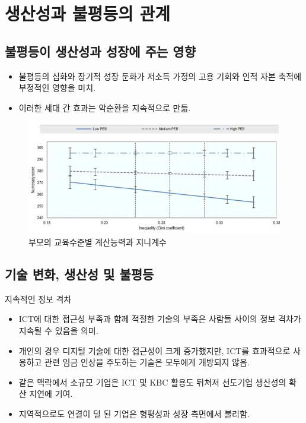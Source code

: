 \documentclass[aspectratio=169,xcolor=dvipsnames,handout]{beamer}
\begin{document}
\section{생산성과 불평등의 관계}

\subsection{ 불평등이 생산성과 성장에 주는 영향}

\begin{frame}{}
    \begin{itemize}
        \item 불평등의 심화와 장기적 성장 둔화가 저소득 가정의 고용 기회와 인적 자본 축적에 부정적인 영향을 미치.
        \item 이러한 세대 간 효과는 악순환을 지속적으로 만듦.
    \end{itemize}
    \begin{figure}
        \centering
        \includegraphics[scale=.3]{pic/tpin3.1.png}
        \caption{부모의 교육수준별 계산능력과 지니계수}
    \end{figure}
\end{frame}


\subsection{ 기술 변화, 생산성 및 불평등}

\begin{frame}{지속적인 정보 격차}
    \begin{itemize}
        \item  ICT에 대한 접근성 부족과 함께 적절한 기술의 부족은 사람들 사이의 정보 격차가 지속될 수 있음을 의미.
        \item 개인의 경우 디지털 기술에 대한 접근성이 크게 증가했지만, ICT를 효과적으로 사용하고 관련 임금 인상을 주도하는 기술은 모두에게 개방되지 않음.
        \item 같은 맥락에서 소규모 기업은 ICT 및 KBC 활용도 뒤쳐져 선도기업 생산성의 확산 지연에 기여.
        \item 지역적으로도 연결이 덜 된 기업은 형평성과 성장 측면에서 불리함.
    \end{itemize}
\end{frame}
\end{document}
